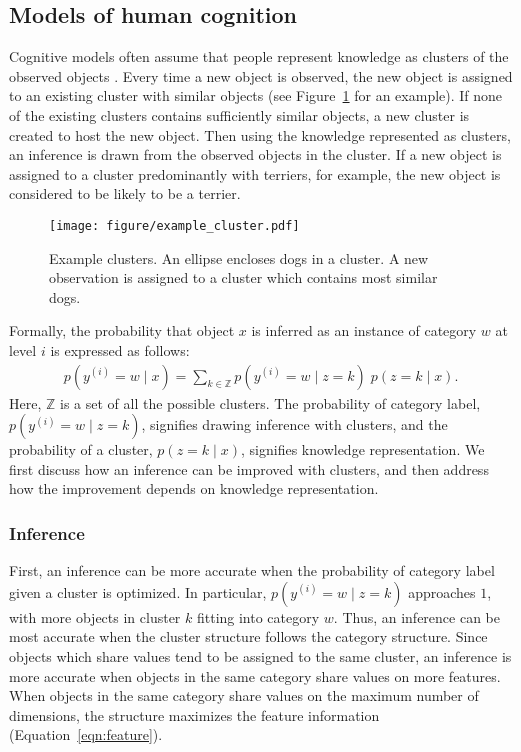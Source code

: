 \documentclass[doc]{apa6}
\begin{document}
\subsection*{Models of human cognition}

Cognitive models often assume that people represent knowledge as clusters of the observed objects
\parencite[e.g.,][]{Anderson1991a, Love2004a, Sanborn2010a}. Every time a new object is observed,
the new object is assigned to an existing cluster with similar objects (see Figure~\ref{fig:cluster}
for an example). If none of the existing clusters contains sufficiently similar objects, a new
    cluster is created to host the new object.  Then using the knowledge represented as clusters, an
    inference is drawn from the observed objects in the cluster.  If a new object is assigned to a
    cluster predominantly with terriers, for example, the new object is considered to be likely to
    be a terrier.

\begin{figure}
    \centering

    \texttt{[image: figure/example\_cluster.pdf]}
    \vspace{6pt}

    \caption{Example clusters. An ellipse encloses dogs in a cluster. A new observation is assigned
    to a cluster which contains most similar dogs.}

\label{fig:cluster}
\end{figure}

Formally, the probability that object $x$ is inferred as an instance of category $w$ at
level $i$ is expressed as follows:
\begin{align}
    p(y^{(i)} = w\; \vert \; x) = \sum_{k \in \mathbb{Z}}
    p(y^{(i)} = w \; \vert \; z = k)
    \;
    p(z = k \; \vert \; x).
\end{align}
Here, $\mathbb{Z}$ is a set of all the possible clusters. The probability of category label,
$p(y^{(i)} = w \; \vert \; z = k)$, signifies drawing inference with clusters, and the probability
of a cluster, $p(z = k \; \vert \; x)$, signifies knowledge representation. We first discuss how an
inference can be improved with clusters, and then address how the improvement depends on knowledge
representation.

\subsubsection*{Inference}

First, an inference can be more accurate when the probability of category label given a cluster is
optimized. In particular, $p(y^{(i)} = w \; \vert \; z = k)$ approaches $1$, with more objects in
cluster $k$ fitting into category $w$. Thus, an inference can be most accurate when the cluster
structure follows the category structure.  Since objects which share values tend to be assigned to
the same cluster, an inference is more accurate when objects in the same category share values on
more features. When objects in the same category share values on the maximum number of dimensions,
the structure maximizes the feature information (Equation~\ref{eqn:feature}).
\end{document}
